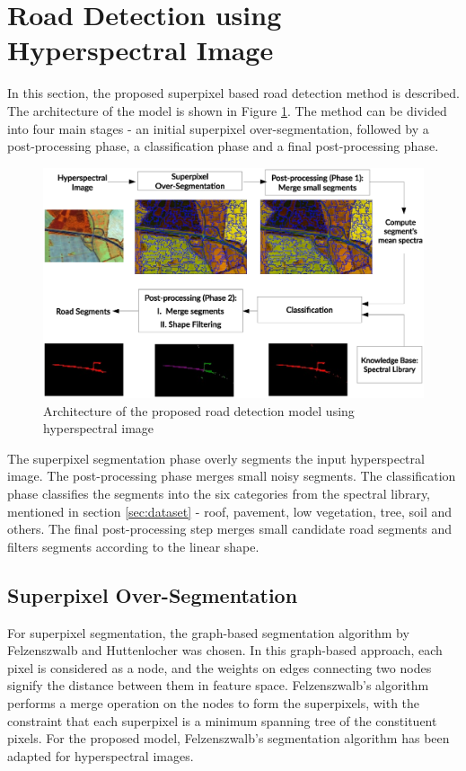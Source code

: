\documentclass[12pt,twoside]{article}
\theoremstyle{plain}
\theoremstyle{definition}
\theoremstyle{remark}
\begin{document}
\section{Road Detection using Hyperspectral Image}
\label{sec:model}
In this section, the proposed superpixel based road detection method is described. The architecture of the model is shown in Figure \ref{fig:arch}. The method can be divided into four main stages - an initial superpixel over-segmentation, followed by a post-processing phase, a classification phase and a final post-processing phase.
\begin{figure}[hbtp]
\centering
\includegraphics[width=\textwidth]{src/architecture2.eps}
\caption{Architecture of the proposed road detection model using hyperspectral image}
\label{fig:arch}
\end{figure}
The superpixel segmentation phase overly segments the input hyperspectral image. The post-processing phase merges small noisy segments. The classification phase classifies the segments into the six categories from the spectral library, mentioned in section \ref{sec:dataset} - roof, pavement, low vegetation, tree, soil and others. The final post-processing step merges small candidate road segments and filters segments according to the linear shape.

\subsection{Superpixel Over-Segmentation}
For superpixel segmentation, the graph-based segmentation algorithm by Felzenszwalb and Huttenlocher \cite{felzenszwalb2004efficient} was chosen. In this graph-based approach, each pixel is considered as a node, and the weights on edges connecting two nodes signify the distance between them in feature space. Felzenszwalb's algorithm performs a merge operation on the nodes to form the superpixels, with the constraint that each superpixel is a minimum spanning tree of the constituent pixels. For the proposed model, Felzenszwalb's segmentation algorithm has been adapted for hyperspectral images.
\end{document}
